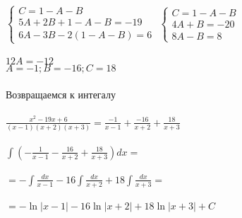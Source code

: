 \documentclass[12pt,a4paper]{article}
\begin{document}
$\begin{cases}
C=1-A-B \\
5A+2B+1-A-B=-19 \\
6A-3B-2(1-A-B)=6
\end{cases}$
$\begin{cases}
C=1-A-B \\
4A+B=-20 \\
8A-B=8
\end{cases}$\\\\
$ 12A=-12 $ \\
$ A=-1; B=-16; C=18 $ \\\\
Возвращаемся к интегалу \\\\
$ \frac{x^2-19x+6}{(x-1)(x+2)(x+3)}=\frac{-1}{x-1}+\frac{-16}{x+2}+\frac{18}{x+3} $ \\\\
$ \int{(-\frac{1}{x-1}-\frac{16}{x+2}+\frac{18}{x+3})dx}= $ \\\\
$ =-\int{\frac{dx}{x-1}}-16\int{\frac{dx}{x+2}}+18\int{\frac{dx}{x+3}}= $ \\\\
$ =-\ln|x-1|-16\ln|x+2|+18\ln|x+3|+C $ \\
\end{document}
